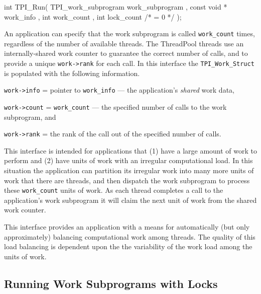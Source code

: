 \begin{center}
\small
\begin{boxedverbatim}
int TPI_Run( TPI_work_subprogram work_subprogram  ,
             const void *        work_info ,
             int                 work_count  ,
             int                 lock_count /* = 0 */ );
\end{boxedverbatim}
\end{center}

An application can specify that the work subprogram is called \texttt{work\_count} times, regardless of the number of available threads.
%
The ThreadPool threads use an internally-shared work counter to guarantee the correct number of calls, and to provide a unique \texttt{work->rank} for each call.
%
In this interface the \texttt{TPI\_Work\_Struct} is populated with the following information.
%
\begin{blist}
\item \texttt{work->info} = pointer to \texttt{work\_info} --- the application's \emph{shared} work data, 
\item \texttt{work->count} = \texttt{work\_count} --- the specified number of calls to the work subprogram, and
\item \texttt{work->rank} = the rank of the call out of the specified number of calls.
\end{blist}



This interface is intended for applications that 
(1) have a large amount of work to perform and
(2) have units of work with an irregular computational load.
%
In this situation the application can partition its irregular work into many more units of work that there are threads, and then dispatch the work subprogram to process these \texttt{work\_count} units of work.
%
As each thread completes a call to the application's work subprogram it will claim the next unit of work from the shared work counter.


This interface provides an application with a means for automatically (but only approximately) balancing computational work among threads.
%
The quality of this load balancing is dependent upon the the variability of the work load among the units of work. 


\subsection{Running Work Subprograms with Locks} \label{sec:RunWorkLock}

